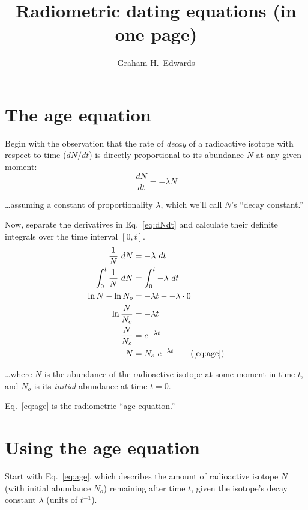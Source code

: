 \documentclass[12pt, letterpaper,twocolumn]{article}
\title{ %
    Radiometric dating equations  
    (in one page) \vspace*{-1ex}}\date{\vspace*{-6ex}}
\author{
    Graham H.~Edwards %
    }
\begin{document}
\maketitle \thispagestyle{empty}

\section{The age equation}

Begin with the observation that the rate of \emph{decay} of a radioactive isotope with respect to time ($dN/dt$) is directly proportional to its abundance $N$ at any given moment:
\begin{equation}\label{eq:dNdt}
    \frac{dN}{dt} = -\lambda N
\end{equation}

\dots assuming a constant of proportionality $\lambda$, which we'll call $N$'s ``decay constant.''

Now, separate the derivatives in Eq.~\ref{eq:dNdt} and calculate their definite integrals over the time interval $\left[0,t\right]$.
\begin{subequations}\label{eq:age}
    \begin{align*}
        \frac{1}{N}~dN &= -\lambda~dt
        \\
        \int_0^t \frac{1}{N}~dN & = \int_0^t -\lambda~dt
        \\
        \ln N - \ln N_o &= -\lambda t - -\lambda \cdot 0
        \\
        \ln \frac{N}{N_o} &= -\lambda t
        \\
        \frac{N}{N_o} &= e^{-\lambda t}
        \\
        N &= N_o~e^{-\lambda t} \tag{\ref{eq:age}}
    \end{align*}
\end{subequations}

\dots where $N$ is the abundance of the radioactive isotope at some moment in time $t$, and $N_o$ is its \emph{initial} abundance at time $t=0$.

Eq.~\ref{eq:age} is the radiometric ``age equation.''

\section{Using the age equation}
Start with Eq.~\ref{eq:age}, which describes the amount of radioactive isotope $N$ (with initial abundance $N_o$) remaining after time $t$, given the isotope's decay constant $\lambda$ (units of $t^{-1}$).
\end{document}
